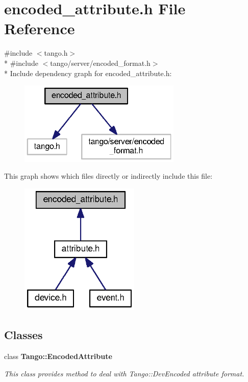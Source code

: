 \section{encoded\-\_\-attribute.\-h File Reference}
\label{encoded__attribute_8h}
{\ttfamily \#include $<$tango.\-h$>$}\\*
{\ttfamily \#include $<$tango/server/encoded\-\_\-format.\-h$>$}\\*
Include dependency graph for encoded\-\_\-attribute.\-h\-:
\nopagebreak
\begin{figure}[H]
\begin{center}
\leavevmode
\includegraphics[width=219pt]{d8/d2f/encoded__attribute_8h__incl}
\end{center}
\end{figure}
This graph shows which files directly or indirectly include this file\-:
\nopagebreak
\begin{figure}[H]
\begin{center}
\leavevmode
\includegraphics[width=161pt]{d6/dea/encoded__attribute_8h__dep__incl}
\end{center}
\end{figure}
\subsection*{Classes}
\begin{DoxyCompactItemize}
\item 
class {\bf Tango\-::\-Encoded\-Attribute}
\begin{DoxyCompactList}\small\item\em This class provides method to deal with Tango\-::\-Dev\-Encoded attribute format. \end{DoxyCompactList}\end{DoxyCompactItemize}
